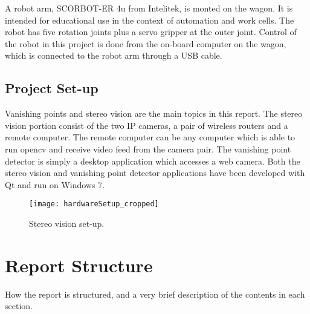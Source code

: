 A robot arm, SCORBOT-ER 4u from Intelitek, is monted on the wagon. It is intended for educational use in the context of automation and work cells. The robot has five rotation joints plus a servo gripper at the outer joint. Control of the robot in this project is done from the on-board computer on the wagon, which is connected to the robot arm through a USB cable. 


\subsection{Project Set-up}

Vanishing points and stereo vision are the main topics in this report. The stereo vision portion consist of the two IP cameras, a pair of wireless routers and a remote computer. The remote computer can be any computer which is able to run \gls{opencv} and receive video feed from the camera pair. The vanishing point detector is simply a desktop application which accesses a web camera. Both the stereo vision and vanishing point detector applications have been developed with Qt and run on Windows 7.

\begin{figure}
	\texttt{[image: hardwareSetup\_cropped]}
	\caption{\label{fig:hardware}Stereo vision set-up.}
\end{figure}

\section{Report Structure}
How the report is structured, and a very brief description of the contents in each section.